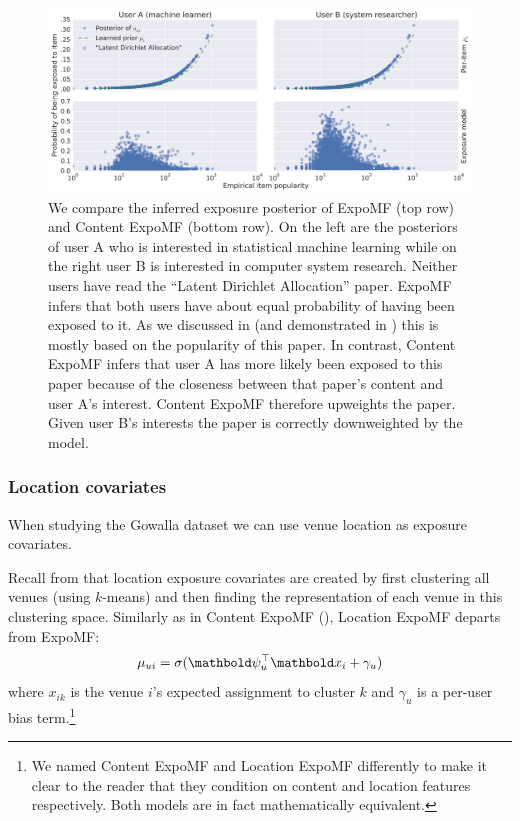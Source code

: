 \begin{figure}
  \centering
    \includegraphics[width=\textwidth]{fig/vanilla_vs_SI}
    \caption{We compare the inferred exposure posterior of ExpoMF (top row)
    and Content ExpoMF (bottom row). On the left are the posteriors of user A
    who is interested in statistical machine learning while on the right
    user B is interested in computer system research. Neither users have
    read the ``Latent Dirichlet Allocation'' paper. ExpoMF
    infers that both users have about equal probability of having been
    exposed to it. As we discussed in  (and demonstrated in ) this is mostly based on the
    popularity of this paper. In contrast, Content ExpoMF infers that
    user A has more likely been exposed to this paper because of the closeness
    between that paper's content and user A's interest. Content ExpoMF
    therefore upweights the paper. Given user B's interests the paper is
    correctly downweighted by the model.}
    \label{chpt:expomf:fig:si}
\end{figure}

\subsubsection{Location covariates}
\label{sec:chpt:expomf:sec:si_location}

When studying the Gowalla dataset we can use venue location as exposure covariates.

Recall from  that location exposure covariates are created
by first clustering all venues (using $k$-means) and then finding the
representation of each venue in this clustering space. Similarly as in Content
ExpoMF (), Location ExpoMF departs from ExpoMF:
\begin{displaymath} \mu_{ui}= \sigma(\mb\psi_u^\top \mbx_i + \gamma_u)\end{displaymath}
where $x_{ik}$ is the venue $i$'s expected assignment to cluster $k$ and
$\gamma_u$ is a per-user bias term.\footnote{We named Content ExpoMF
and Location ExpoMF differently to make it clear to the reader that they
condition on content and location features respectively. Both models are
in fact mathematically equivalent.}

